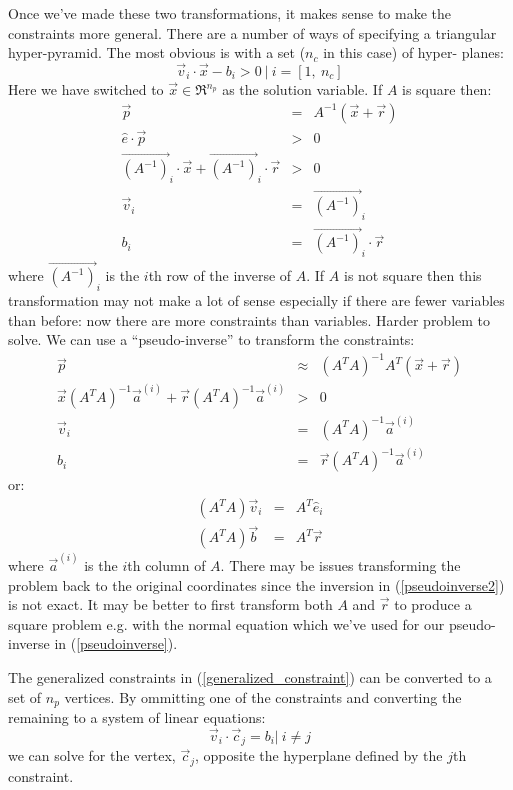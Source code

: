 \documentclass{article}
\begin{document}
Once we've made these two transformations, it makes sense to make the constraints
more general.  There are a number of ways of specifying a triangular
hyper-pyramid.  The most obvious is with a set ($n_c$ in this case) of hyper-
planes:
\begin{equation}
	\vec v_i \cdot \vec x - b_i > 0 ~ | ~ i=[1, ~n_c]
\label{generalized_constraint}
\end{equation}
Here we have switched to $\vec x \in \Re^{n_p}$ as the solution variable.
If $A$ is square then:
\begin{eqnarray}
	\vec p & = & A^{-1} (\vec x + \vec r) \\
	\hat e \cdot \vec p & > & 0 \\
	\overrightarrow{(A^{-1})}_i \cdot \vec x + \overrightarrow{(A^{-1})}_i \cdot \vec r & > & 0 \\
	\vec v_i & = & \overrightarrow{(A^{-1})}_i \\
	b_i & = & \vec{(A^{-1})}_i \cdot \vec r
\end{eqnarray}
where $\overrightarrow{(A^{-1})}_i$ is the $i$th row of the inverse of $A$.
If $A$ is not square then this transformation may not make a lot of sense 
especially if there are fewer variables than before: now there are more constraints
than variables. Harder problem to solve. 
We can use a ``pseudo-inverse'' to transform the constraints:
\begin{eqnarray}
	\vec p & \approx & (A^T A)^{-1} A^T (\vec x + \vec r) \label{pseudoinverse2}\\
	\vec x (A^T A)^{-1} \vec a^{(i)} + \vec r (A^T A)^{-1} \vec a^{(i)} & > & 0 \\
	\vec v_i & = & (A^T A)^{-1} \vec a^{(i)} \\
	b_i & = & \vec r (A^T A)^{-1} \vec a^{(i)}
\end{eqnarray}
or:
\begin{eqnarray}
	(A^T A) \vec v_i & = & A^T \hat e_i\\
	(A^T A) \vec b & = & A^T \vec r
\end{eqnarray}
where $\vec a^{(i)}$ is the $i$th column of $A$.
There may be issues transforming the problem back to the original
coordinates since the inversion in (\ref{pseudoinverse2}) is not exact.
It may be better to first transform both $A$ and $\vec r$ to produce a square problem
e.g. with the normal equation which we've used for our pseudo-inverse in (\ref{pseudoinverse}).

The generalized constraints in (\ref{generalized_constraint}) can be 
converted to a set of $n_p$ vertices.  By ommitting one of the constraints
and converting the remaining to a system of linear equations:
\begin{equation}
\vec v_i \cdot \vec c_j = b_i | ~ i \ne j
\end{equation}
we can solve for the vertex, $\vec c_j$, opposite the hyperplane defined 
by the $j$th constraint.
\end{document}
